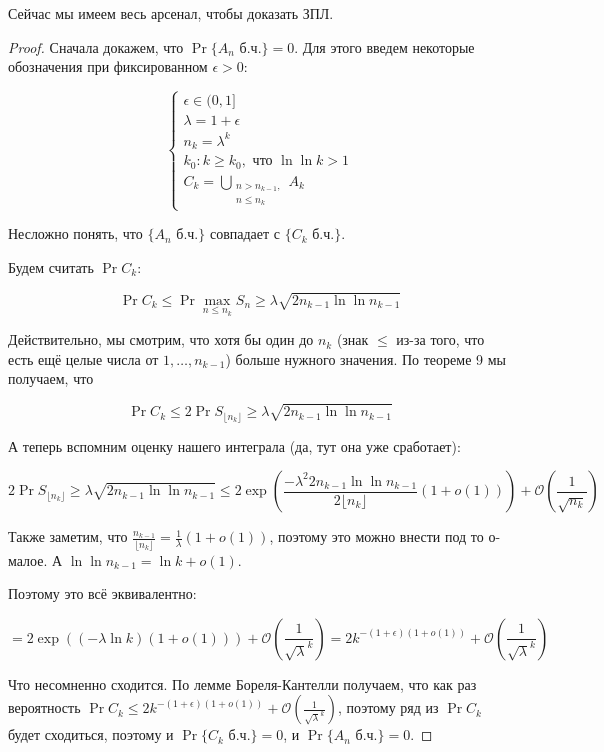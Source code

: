 Сейчас мы имеем весь арсенал, чтобы доказать ЗПЛ.

\begin{proof}
  Сначала докажем, что $\Pr{\{\text{$A_n$ б.ч.}\}} = 0$. Для этого введем некоторые
  обозначения при фиксированном $\epsilon > 0$:

  \[
    \begin{cases}
      \epsilon \in (0, 1]\\
      \lambda = 1 + \epsilon\\
      n_k = \lambda^k\\
      k_0: k \geq k_0, \text{ что } \ln\ln k > 1\\
      C_k = \bigcup\limits_{\substack{n > n_{k - 1},\\n \leq n_k}} A_k
    \end{cases}
  \]

  Несложно понять, что $\{A_n\text{ б.ч.}\}$ совпадает с $\{C_k\text{ б.ч.}\}$.

  Будем считать $\Pr{C_k}$:

  \[
    \Pr{C_k} \leq \Pr{\max\limits_{n \leq n_k} S_n \geq \lambda\sqrt{2n_{k - 1}\ln\ln n_{k - 1}}}
  \]

  Действительно, мы смотрим, что хотя бы один до $n_k$ (знак $\leq$ из-за того,
  что есть ещё целые числа от $1,\ldots,n_{k - 1}$) больше нужного значения.
  По теореме 9 мы получаем, что

  \[
    \Pr{C_k} \leq 2\Pr{S_{\lfloor n_k\rfloor} \geq \lambda\sqrt{2n_{k - 1}\ln\ln n_{k - 1}}}
  \]

  А теперь вспомним оценку нашего интеграла (да, тут она уже сработает):

  \[
    2\Pr{S_{\lfloor n_k\rfloor} \geq \lambda\sqrt{2n_{k - 1}\ln\ln n_{k - 1}}}
    \leq 2\exp\left(\frac{-\lambda^2 2 n_{k - 1}\ln\ln n_{k - 1}}{2\lfloor n_k\rfloor}(1 + o(1))\right)
    + \mathcal{O}\left(\frac{1}{\sqrt{n_k}}\right)
  \]

  Также заметим, что $\frac{n_{k - 1}}{\lfloor n_k \rfloor} = \frac{1}{\lambda}(1 + o(1))$,
  поэтому это можно внести под то о-малое. А $\ln\ln n_{k - 1} = \ln k + o(1)$.

  Поэтому это всё эквивалентно:

  \[
    = 2\exp\left((-\lambda \ln k)(1 + o(1))\right)
    + \mathcal{O}\left(\frac{1}{\sqrt{\lambda}^k}\right) = 
    2 k^{-(1 + \epsilon)(1 + o(1))} 
    + \mathcal{O}\left(\frac{1}{\sqrt{\lambda}^k}\right)
  \]

  Что несомненно сходится. По лемме Бореля-Кантелли получаем, что как раз
  вероятность $\Pr{C_k} \leqslant  2 k^{-(1 + \epsilon)(1 + o(1))} 
  + \mathcal{O}\left(\frac{1}{\sqrt{\lambda}^k}\right)$, поэтому ряд
  из $\Pr{C_k}$ будет сходиться, поэтому и  $\Pr{\{C_k\text{ б.ч.}\}} = 0$,
  и $\Pr{\{A_n\text{ б.ч.}\}} = 0$.


\end{proof}
